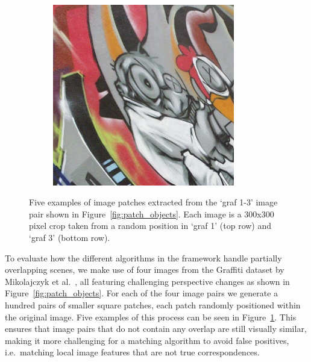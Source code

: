 \documentclass[review]{elsarticle}
\begin{document}
\begin{figure}[htb]
\begin{subfigure}[t]{0.16\columnwidth}
    \end{subfigure}%
    ~~ %
    \begin{subfigure}[t]{0.16\columnwidth}
        \centering
        \includegraphics[width=1\columnwidth]{images/acr/patches/patch_5_2}
    \end{subfigure}%
    \caption{Five examples of image patches extracted from the `graf 1-3' image pair shown in Figure~\ref{fig:patch_objects}. Each image is a 300x300 pixel crop taken from a random position in `graf 1' (top row) and `graf 3' (bottom row).}
    \label{fig:patch_examples}
\end{figure}

To evaluate how the different algorithms in the framework handle partially overlapping scenes, we make use of four images from the Graffiti dataset by Mikolajczyk et al.\ \cite{mikolajczyk2005performance}, all featuring challenging perspective changes as shown in Figure\ \ref{fig:patch_objects}. For each of the four image pairs we generate a hundred pairs of smaller square patches, each patch randomly positioned within the original image. Five examples of this process can be seen in Figure~\ref{fig:patch_examples}. This ensures that image pairs that do not contain any overlap are still visually similar, making it more challenging for a matching algorithm to avoid false positives, i.e.\ matching local image features that are not true correspondences.
\end{document}

